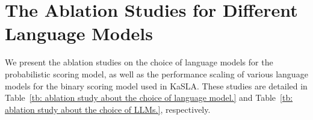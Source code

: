 \section{The Ablation Studies for Different Language Models}
We present the ablation studies on the choice of language models for the probabilistic scoring model, as well as the performance scaling of various language models for the binary scoring model used in KaSLA. These studies are detailed in Table~\ref{tb: ablation study about the choice of language model.} and Table~\ref{tb: ablation study about the choice of LLMs.}, respectively.

   
\begin{table}[htbp]
   \begin{center}
   \caption{Execution Accuracy (EX) (\%) of the scaling up performance about the choice of language model for binary scoring model.  We conduct the experiments for CodeS + KaSLA on BIRD-dev and use CodeS with CodeS-15B as the text-to-SQL backbone.}
	        \label{tb: ablation study about the choice of LLMs.}
   \end{center}
   \end{table}




\begin{table}[htbp]
   \begin{center}
   \caption{Execution Accuracy (EX) (\%) of the ablation study about the choice of language model for probabilistic scoring model.  We conduct the experiments for CodeS + KaSLA on BIRD-dev and use CodeS with CodeS-15B as the text-to-SQL backbone.}
	        \label{tb: ablation study about the choice of language model.}
   \end{center}
   \end{table}
